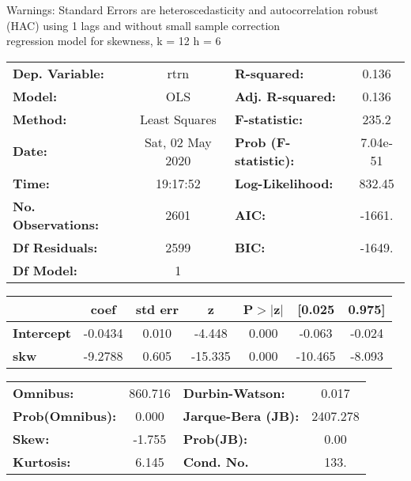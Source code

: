Warnings: \newline
 [1] Standard Errors are heteroscedasticity and autocorrelation robust (HAC) using 1 lags and without small sample correction\\ 

regression model for skewness, k = 12 h = 6\begin{center}
\begin{tabular}{lclc}
\toprule
\textbf{Dep. Variable:}    &       rtrn       & \textbf{  R-squared:         } &     0.136   \\
\textbf{Model:}            &       OLS        & \textbf{  Adj. R-squared:    } &     0.136   \\
\textbf{Method:}           &  Least Squares   & \textbf{  F-statistic:       } &     235.2   \\
\textbf{Date:}             & Sat, 02 May 2020 & \textbf{  Prob (F-statistic):} &  7.04e-51   \\
\textbf{Time:}             &     19:17:52     & \textbf{  Log-Likelihood:    } &    832.45   \\
\textbf{No. Observations:} &        2601      & \textbf{  AIC:               } &    -1661.   \\
\textbf{Df Residuals:}     &        2599      & \textbf{  BIC:               } &    -1649.   \\
\textbf{Df Model:}         &           1      & \textbf{                     } &             \\
\bottomrule
\end{tabular}
\begin{tabular}{lcccccc}
                   & \textbf{coef} & \textbf{std err} & \textbf{z} & \textbf{P$> |$z$|$} & \textbf{[0.025} & \textbf{0.975]}  \\
\midrule
\textbf{Intercept} &      -0.0434  &        0.010     &    -4.448  &         0.000        &       -0.063    &       -0.024     \\
\textbf{skw}       &      -9.2788  &        0.605     &   -15.335  &         0.000        &      -10.465    &       -8.093     \\
\bottomrule
\end{tabular}
\begin{tabular}{lclc}
\textbf{Omnibus:}       & 860.716 & \textbf{  Durbin-Watson:     } &    0.017  \\
\textbf{Prob(Omnibus):} &   0.000 & \textbf{  Jarque-Bera (JB):  } & 2407.278  \\
\textbf{Skew:}          &  -1.755 & \textbf{  Prob(JB):          } &     0.00  \\
\textbf{Kurtosis:}      &   6.145 & \textbf{  Cond. No.          } &     133.  \\
\bottomrule
\end{tabular}
\end{center}

